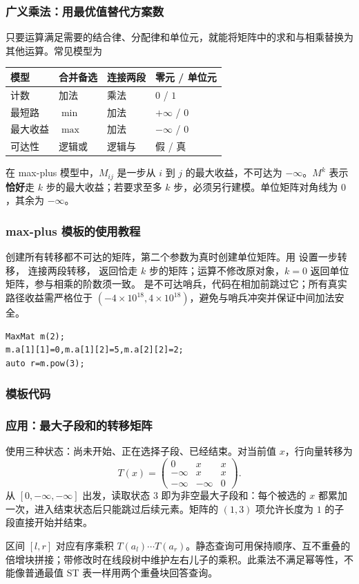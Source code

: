 \subsubsection*{广义乘法：用最优值替代方案数}
只要运算满足需要的结合律、分配律和单位元，就能将矩阵中的求和与相乘替换为其他运算。常见模型为
\begin{center}
\small
\begin{tabular}{@{}llll@{}}
\toprule
模型 & 合并备选 & 连接两段 & 零元 / 单位元 \\
\midrule
计数 & 加法 & 乘法 & $0$ / $1$ \\
最短路 & $\min$ & 加法 & $+\infty$ / $0$ \\
最大收益 & $\max$ & 加法 & $-\infty$ / $0$ \\
可达性 & 逻辑或 & 逻辑与 & 假 / 真 \\
\bottomrule
\end{tabular}
\end{center}
在 max-plus 模型中，$M_{ij}$ 是一步从 $i$ 到 $j$ 的最大收益，不可达为 $-\infty$。$M^k$ 表示\textbf{恰好}走 $k$ 步的最大收益；若要求至多 $k$ 步，必须另行建模。单位矩阵对角线为 $0$，其余为 $-\infty$。

\subsubsection*{max-plus 模板的使用教程}
 创建所有转移都不可达的矩阵，第二个参数为真时创建单位矩阵。用  设置一步转移， 连接两段转移， 返回恰走 $k$ 步的矩阵；运算不修改原对象，$k=0$ 返回单位矩阵，参与相乘的阶数须一致。 是不可达哨兵，代码在相加前跳过它；所有真实路径收益需严格位于 $(-4\times10^{18},4\times10^{18})$，避免与哨兵冲突并保证中间加法安全。
\begin{lstlisting}[style=mtycpp,numbers=none]
MaxMat m(2);
m.a[1][1]=0,m.a[1][2]=5,m.a[2][2]=2;
auto r=m.pow(3);
\end{lstlisting}

\subsubsection*{模板代码}

\subsubsection*{应用：最大子段和的转移矩阵}
使用三种状态：尚未开始、正在选择子段、已经结束。对当前值 $x$，行向量转移为
\[
    T(x)=\begin{pmatrix}
        0&x&x\\
        -\infty&x&x\\
        -\infty&-\infty&0
    \end{pmatrix}.
\]
从 $[0,-\infty,-\infty]$ 出发，读取状态 $3$ 即为非空最大子段和：每个被选的 $x$ 都累加一次，进入结束状态后只能跳过后续元素。矩阵的 $(1,3)$ 项允许长度为 $1$ 的子段直接开始并结束。

区间 $[l,r]$ 对应有序乘积 $T(a_l)\cdots T(a_r)$。静态查询可用保持顺序、互不重叠的倍增块拼接；带修改时在线段树中维护左右儿子的乘积。此乘法不满足幂等性，不能像普通最值 ST 表一样用两个重叠块回答查询。

